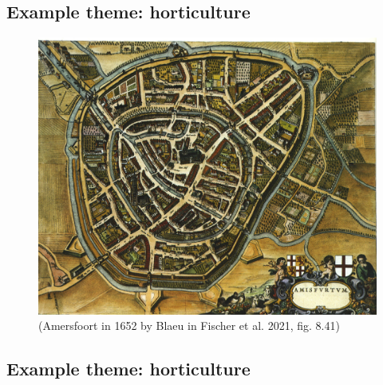 \documentclass[
  letterpaper,
  DIV=11,
  numbers=noendperiod]{scrartcl}
\begin{document}
\hypertarget{example-theme-horticulture}{%
\subsection{Example theme:
horticulture}\label{example-theme-horticulture}}

\begin{figure}

{\centering \includegraphics{images/Figure_8.41_Blaeu_1652_-_Amersfoort.jpg}

}

\caption{(Amersfoort in 1652 by Blaeu in Fischer et al. 2021, fig.
8.41)}

\end{figure}

\hypertarget{example-theme-horticulture-1}{%
\subsection{Example theme:
horticulture}\label{example-theme-horticulture-1}}
\end{document}
